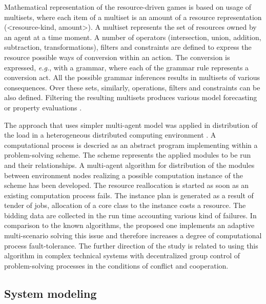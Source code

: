 \documentclass[conference]{IEEEtran}
\begin{document}
Mathematical representation of the resource-driven games is based on usage of multisets, where each item of a multiset is an amount of a resource representation (<resource-kind, amount>). A multiset represents the set of resources owned by an agent at a time moment. A number of operators (intersection, union, addition, subtraction, transformations), filters and constraints are defined to express the resource possible ways of conversion within an action. The conversion is expressed, \emph{e.g.}, with a grammar, where each of the grammar rule represents a conversion act. All the possible grammar inferences results in multisets of various consequences. Over these sets, similarly, operations, filters and constraints can be also defined. Filtering the resulting multisets produces various model forecasting or property evaluations \cite{rbg}.

The approach that uses simpler multi-agent model was applied in distribution of the load in a heterogeneous distributed computing environment \cite{b1}. A computational process is descried as an abstract program implementing within a problem-solving scheme. The scheme represents the applied modules to be run and their relationships. A multi-agent algorithm for distribution of the modules between environment nodes realizing a possible computation instance of the scheme has been developed. The resource reallocation is started as soon as an existing computation process fails. The instance plan is generated as a result of tender of jobs, allocation of a core class to the instance costs a resource. The bidding data are collected in the run time accounting various kind of failures. In comparison to the known algorithms, the proposed one implements an adaptive multi-scenario solving this issue and therefore increases a degree of computational process fault-tolerance. The further direction of the study is related to using this algorithm in complex technical systems with decentralized group control of problem-solving processes in the conditions of conflict and cooperation.


\subsection{System modeling}
\label{sec:sys-mdl}
\end{document}
